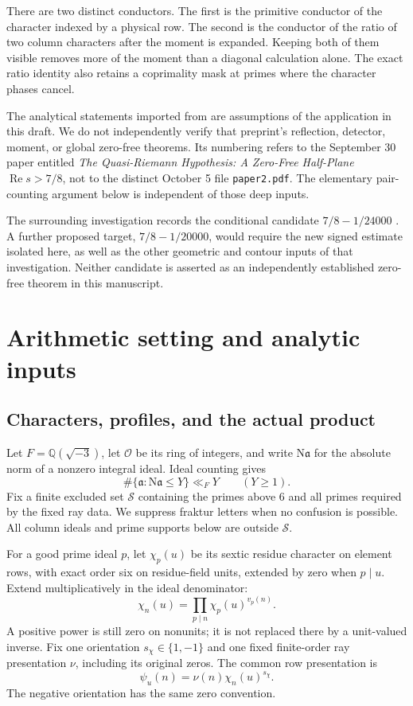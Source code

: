 \documentclass[11pt]{article}
\theoremstyle{definition}
\theoremstyle{remark}
\numberwithin{equation}{section}
\newcommand{\Nm}{\mathrm N}
\newcommand{\OO}{\mathcal O}
\newcommand{\Rea}{\operatorname{Re}}
\begin{document}
There are two distinct conductors. The first is the primitive conductor
of the character indexed by a physical row. The second is the conductor
of the ratio of two column characters after the moment is expanded.
Keeping both of them visible removes more of the moment than a
diagonal calculation alone. The exact ratio identity also retains a
coprimality mask at primes where the character phases cancel.

The analytical statements imported from \cite{openai} are assumptions
of the application in this draft. We do not independently verify that
preprint's reflection, detector, moment, or global zero-free theorems.
Its numbering refers to the September 30 paper entitled
\emph{The Quasi-Riemann Hypothesis: A Zero-Free Half-Plane
$\Rea s>7/8$}, not to the distinct October 5 file
\texttt{paper2.pdf}. The elementary pair-counting argument below is
independent of those deep inputs.

The surrounding investigation records the conditional candidate
$7/8-1/24000$ \cite{records}. A further proposed target,
$7/8-1/20000$, would require the new signed estimate isolated here,
as well as the other geometric and contour inputs of that investigation.
Neither candidate is asserted as an independently established
zero-free theorem in this manuscript.

\section{Arithmetic setting and analytic inputs}\label{sec:setting}

\subsection{Characters, profiles, and the actual product}

Let $F=\mathbb Q(\sqrt{-3})$, let $\OO$ be its ring of integers, and
write $\Nm\mathfrak a$ for the absolute norm of a nonzero integral
ideal. Ideal counting gives
\begin{equation}\label{eq:ideal-count}
\#\{\mathfrak a:\Nm\mathfrak a\le Y\}\ll_F Y\qquad(Y\ge1).
\end{equation}
Fix a finite excluded set $\mathcal S$ containing the primes above $6$
and all primes required by the fixed ray data. We suppress fraktur
letters when no confusion is possible. All column ideals and prime
supports below are outside $\mathcal S$.

For a good prime ideal $p$, let $\chi_p(u)$ be its sextic residue
character on element rows, with exact order six on residue-field units,
extended by zero when $p\mid u$. Extend multiplicatively in the ideal
denominator:
\[
\chi_n(u)=\prod_{p\mid n}\chi_p(u)^{v_p(n)}.
\]
A positive power is still zero on nonunits; it is not replaced there
by a unit-valued inverse. Fix one orientation $s_\chi\in\{1,-1\}$ and
one fixed finite-order ray presentation $\nu$, including its original
zeros. The common row presentation is
\begin{equation}\label{eq:presentation}
\psi_u(n)=\nu(n)\chi_n(u)^{s_\chi}.
\end{equation}
The negative orientation has the same zero convention.
\end{document}
